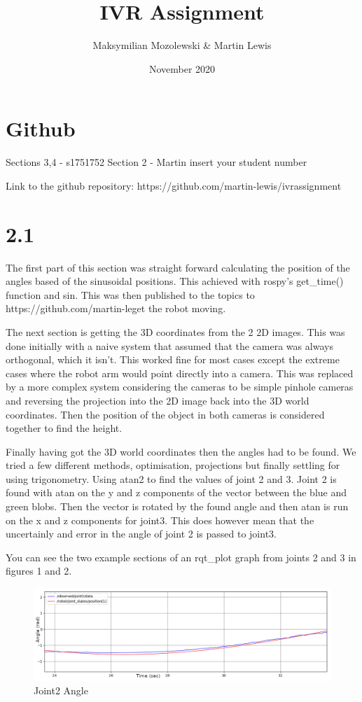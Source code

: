 \documentclass[11pt]{report}
\title{IVR Assignment}
\author{Maksymilian Mozolewski \& Martin Lewis}
\date{November 2020}
\begin{document}

\section*{Github}
Sections 3,4 - s1751752
Section 2 - \<Martin insert your student number\>

\noindent Link to the github repository:  https://github.com/martin-lewis/ivrassignment

\section*{2.1}

The first part of this section was straight forward calculating the position of the angles based of the sinusoidal positions. This achieved with rospy's get\_time() function and sin.
This was then published to the topics to 
\noindent https://github.com/martin-leget the robot moving.

The next section is getting the 3D coordinates from the 2 2D images. This was done initially with a naive system that assumed that the camera was always orthogonal,
which it isn't. This worked fine for most cases except the extreme cases where the robot arm would point directly into a camera. This was replaced by a more complex
system considering the cameras to be simple pinhole cameras and reversing the projection into the 2D image back into the 3D world coordinates. Then the position
of the object in both cameras is considered together to find the height.

Finally having got the 3D world coordinates then the angles had to be found. We tried a few different methods, optimisation, projections but finally settling for using trigonometry. Using atan2 to find the values of
joint 2 and 3. Joint 2 is found with atan on the y and z components of the vector between the blue and green blobs. Then the vector is rotated by the found angle
and then atan is run on the x and z components for joint3. This does however mean that the uncertainly and error in the angle of joint 2 is passed to joint3.

You can see the two example sections of an rqt\_plot graph from joints 2 and 3 in figures 1 and 2.
\begin{figure}[H]
    \includegraphics[width=\linewidth]{joint2.png}
    \caption{Joint2 Angle}
\end{figure}
\end{document}
